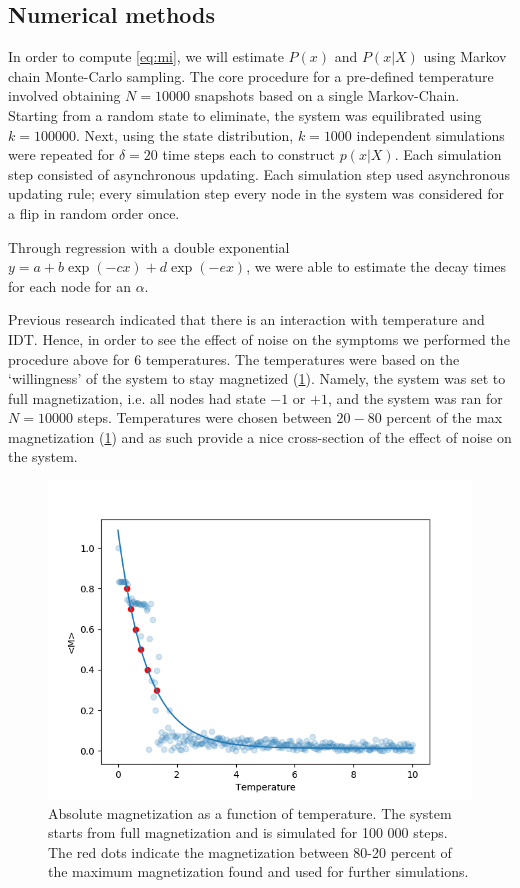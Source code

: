 \documentclass[twoside, twocolumn]{article}
\begin{document}
	\subsection{Numerical methods} \label{sec:numerical}
	In order to compute \ref{eq:mi}, we will estimate $P(x)$ and $P(x\vert X)$ using Markov chain Monte-Carlo sampling. The core procedure for a pre-defined temperature involved obtaining $N = 10 000$ snapshots based on a single Markov-Chain. Starting from a random state to eliminate, the system was equilibrated using $k = 100 000$. Next, using the state distribution, $k = 1000$ independent simulations were repeated for $\delta = 20$ time steps each to construct $p(x \vert X)$. Each simulation step consisted of asynchronous updating. Each simulation step used asynchronous updating rule; every simulation step every node in the system was considered for a flip in random order once.

	Through regression with a double exponential $y = a + b\exp(-c x) + d \exp(- e x)$, we were able to estimate the decay times for each node for an $\alpha$.

	Previous research indicated that there is an interaction with temperature and IDT\cite{Quax2013}. Hence, in order to see the effect of noise on the symptoms we performed the procedure above for 6 temperatures. The temperatures were based on the `willingness' of the system to stay magnetized (\ref{fig:magnetizations}). Namely, the system was set to full magnetization, i.e. all nodes had state $-1$ or $+1$, and the system was ran for $N = 10 000$ steps. Temperatures were chosen between $20-80$ percent of the max magnetization (\ref{fig:magnetizations}) and as such provide a nice cross-section of the effect of noise on the system.

	\begin{figure}[ht]
		\centering\includegraphics[width=\textwidth]{figures/magnetization-temp.png}
		\caption{Absolute magnetization as a function of temperature. The system starts from full magnetization and is simulated for 100 000 steps. The red dots indicate the magnetization between 80-20 percent of the maximum magnetization found and used for further simulations.}
		\label{fig:magnetizations}
	\end{figure}
\end{document}
